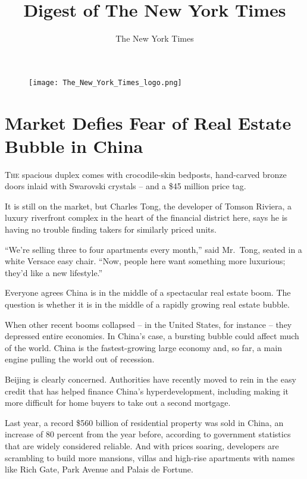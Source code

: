 ﻿\documentclass[12pt]{article}
\title{Digest of The New York Times}
\author{The New York Times}
\begin{document}
\date{}
\thispagestyle{empty}

\begin{figure}
\texttt{[image: The\_New\_York\_Times\_logo.png]}
\vspace{-15ex}
\end{figure}
\renewcommand\contentsname{}
{\footnotesize\textsf{\tableofcontents}}

\clearpage
\setcounter{page}{1}

\section{Market Defies Fear of Real Estate Bubble in China}

\lettrine{T}{he} spacious duplex comes with crocodile-skin bedposts,
hand-carved bronze doors inlaid with Swarovski crystals -- and a \$45 million price tag.


It is still on the market, but Charles Tong, the developer of Tomson Riviera, a luxury riverfront
complex in the heart of the financial district here, says he is having no trouble finding takers for
similarly priced units.

``We're selling three to four apartments every month,'' said Mr.~Tong, seated in a white Versace
easy chair. ``Now, people here want something more luxurious; they'd like a new lifestyle.''

Everyone agrees China is in the middle of a spectacular real estate boom. The question is whether it
is in the middle of a rapidly growing real estate bubble.

When other recent booms collapsed -- in the United States, for instance -- they depressed entire
economies. In China's case, a bursting bubble could affect much of the world. China is the
fastest-growing large economy and, so far, a main engine pulling the world out of recession.

Beijing is clearly concerned. Authorities have recently moved to rein in the easy credit that has
helped finance China's hyperdevelopment, including making it more difficult for home buyers to take
out a second mortgage.

Last year, a record \$560 billion of residential property was sold in China, an increase of 80
percent from the year before, according to government statistics that are widely considered
reliable. And with prices soaring, developers are scrambling to build more mansions, villas and
high-rise apartments with names like Rich Gate, Park Avenue and Palais de Fortune.
\end{document}
